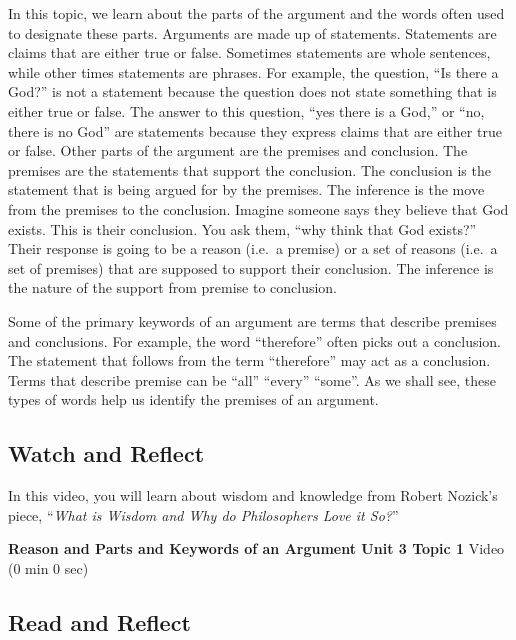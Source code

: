 \documentclass[
]{book}
\begin{document}
In this topic, we learn about the parts of the argument and the words often used to designate these parts. Arguments are made up of statements. Statements are claims that are either true or false. Sometimes statements are whole sentences, while other times statements are phrases. For example, the question, ``Is there a God?'' is not a statement because the question does not state something that is either true or false. The answer to this question, ``yes there is a God,'' or ``no, there is no God'' are statements because they express claims that are either true or false. Other parts of the argument are the premises and conclusion. The premises are the statements that support the conclusion. The conclusion is the statement that is being argued for by the premises. The inference is the move from the premises to the conclusion. Imagine someone says they believe that God exists. This is their conclusion. You ask them, ``why think that God exists?'' Their response is going to be a reason (i.e.~a premise) or a set of reasons (i.e.~a set of premises) that are supposed to support their conclusion. The inference is the nature of the support from premise to conclusion.

Some of the primary keywords of an argument are terms that describe premises and conclusions. For example, the word ``therefore'' often picks out a conclusion. The statement that follows from the term ``therefore'' may act as a conclusion. Terms that describe premise can be ``all'' ``every'' ``some''. As we shall see, these types of words help us identify the premises of an argument.

\hypertarget{watch-and-reflect-17}{%
\subsection*{Watch and Reflect}\label{watch-and-reflect-17}}

In this video, you will learn about wisdom and knowledge from Robert Nozick's piece, ``\emph{What is Wisdom and Why do Philosophers Love it So?}''

\textbf{Reason and Parts and Keywords of an Argument Unit 3 Topic 1} Video (0 min 0 sec)

\hypertarget{read-and-reflect-7}{%
\subsection*{Read and Reflect}\label{read-and-reflect-7}}
\end{document}
